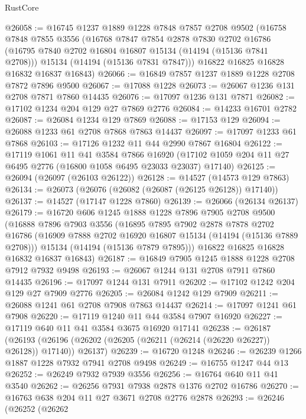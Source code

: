 \begin{lexlean}{RustCore}
\begin{coremodule}
@26058 := @16745
    @1237
    @1889
    @1228
    @7848
    @7857
    @2708
    @9502
    (@16758
      @7848
      @7855
      @3556
      (@16768
        @7847
        @7854
        @2878
        @7830
        @2702
        @16786
        (@16795 @7840 @2702 @16804 @16807 @15134 (@14194 (@15136 @7841 @2708)))
        @15134
        (@14194 (@15136 @7831 @7847)))
      @16822
      @16825
      @16828
      @16832
      @16837
      @16843)
@26066 := @16849 @7857 @1237 @1889 @1228 @2708 @7872 @7896 @9500
@26067 := @17088 @1228
@26073 := @26067 @1236 @131 @2708 @7871 @7860 @14435
@26076 := @17097 @1236 @131 @7871
@26082 := @17102 @1234 @204 @129 @27 @7869 @2776
@26084 := @14233 @16701 @2782
@26087 := @26084 @1234 @129 @7869
@26088 := @17153 @129
@26094 := @26088 @1233 @61 @2708 @7868 @7863 @14437
@26097 := @17097 @1233 @61 @7868
@26103 := @17126 @1232 @11 @44 @2990 @7867 @16804
@26122 := @17119
    @1061
    @11
    @41
    @3584
    @7866
    @16920
    (@17102 @1059 @204 @11 @27 @6495 @2776 (@16800 @1058 @6495 @23033 @23037) @17140)
@26125 := @26094 (@26097 (@26103 @26122))
@26128 := @14527 (@14573 @129 @7863)
@26134 := @26073 (@26076 (@26082 (@26087 (@26125 @26128)) @17140))
@26137 := @14527 (@17147 @1228 @7860)
@26139 := @26066 (@26134 @26137)
@26179 := @16720
    @606
    @1245
    @1888
    @1228
    @7896
    @7905
    @2708
    @9500
    (@16888
      @7896
      @7903
      @3556
      (@16895
        @7895
        @7902
        @2878
        @7878
        @2702
        @16786
        (@16909 @7888 @2702 @16920 @16807 @15134 (@14194 (@15136 @7889 @2708)))
        @15134
        (@14194 (@15136 @7879 @7895)))
      @16822
      @16825
      @16828
      @16832
      @16837
      @16843)
@26187 := @16849 @7905 @1245 @1888 @1228 @2708 @7912 @7932 @9498
@26193 := @26067 @1244 @131 @2708 @7911 @7860 @14435
@26196 := @17097 @1244 @131 @7911
@26202 := @17102 @1242 @204 @129 @27 @7909 @2776
@26205 := @26084 @1242 @129 @7909
@26211 := @26088 @1241 @61 @2708 @7908 @7863 @14437
@26214 := @17097 @1241 @61 @7908
@26220 := @17119 @1240 @11 @44 @3584 @7907 @16920
@26227 := @17119 @640 @11 @41 @3584 @3675 @16920 @17141
@26238 := @26187
    (@26193 (@26196 (@26202 (@26205 (@26211 (@26214 (@26220 @26227)) @26128)) @17140)) @26137)
@26239 := @16720 @1248
@26246 := @26239 @1266 @1887 @1228 @7932 @7941 @2708 @9498
@26249 := @16755 @1247 @44 @13
@26252 := @26249 @7932 @7939 @3556
@26256 := @16764 @640 @11 @41 @3540
@26262 := @26256 @7931 @7938 @2878 @1376 @2702 @16786
@26270 := @16763 @638 @204 @11 @27 @3671 @2708 @2776 @2878
@26293 := @26246
    (@26252
      (@26262

\end{coremodule}
\end{lexlean}
